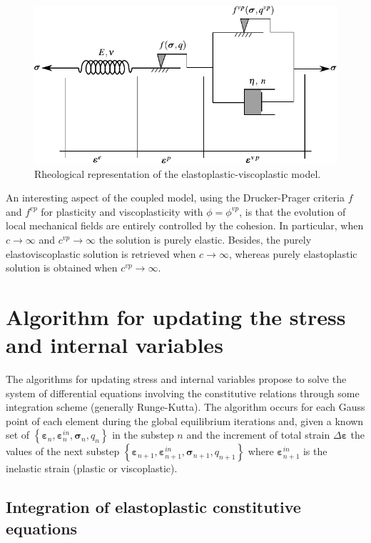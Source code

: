 \documentclass[Journal,letterpaper]{ascelike-new}
\newcommand{\strain}{\boldsymbol{\varepsilon}}
\newcommand{\stress}{\boldsymbol{\sigma}}
\begin{document}
\begin{figure}
	\centering
	\includegraphics[scale=1]{FIG2.pdf}
	\caption{Rheological representation of the elastoplastic-viscoplastic model.}
	\label{reological_scheme}
\end{figure}

An interesting aspect of the coupled model, using the Drucker-Prager criteria $f$ and $f^{vp}$ for plasticity and viscoplasticity with $\phi=\phi^{vp}$, is that the evolution of local mechanical fields are entirely controlled by the cohesion. In particular, when $c \rightarrow \infty$ and $c^{vp} \rightarrow \infty$ the solution is purely elastic. Besides, the purely elastoviscoplastic solution is retrieved when $c \rightarrow \infty$, whereas purely elastoplastic solution is obtained when $c^{vp} \rightarrow \infty$.

\section{Algorithm for updating the stress and internal variables}

The algorithms for updating stress and internal variables propose to solve the system of differential equations involving the constitutive relations through some integration scheme (generally Runge-Kutta). The algorithm occurs for each Gauss point of each element during the global equilibrium iterations and, given a known set of $\left\{ \strain_n, \strain_n^{in},\stress_n,q_n \right\}$ in the substep $n$ and the increment of total strain $\Delta \strain$ the values of the next substep $\left\{ \strain_{n+1}, \strain_{n+1}^{in},\stress_{n+1},q_{n+1} \right\}$ where $\strain_{n+1}^{in}$ is the inelastic strain (plastic or viscoplastic).

\subsection{Integration of elastoplastic constitutive equations}
\end{document}
